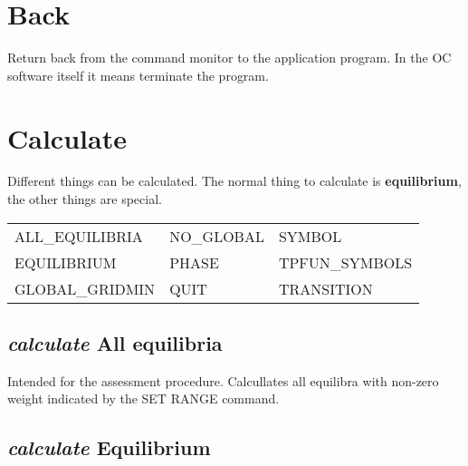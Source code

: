 \documentclass[12pt]{article}
\begin{document}
\section{Back }

Return back from the command monitor to the application program.  In
the OC software itself it means terminate the program.

\section{Calculate }

Different things can be calculated.  The normal thing to calculate is
{\bf equilibrium}, the other things are special.

\begin{tabular}{lll}
 ALL\_EQUILIBRIA &  NO\_GLOBAL  &      SYMBOL\\
 EQUILIBRIUM    &  PHASE     &      TPFUN\_SYMBOLS\\
 GLOBAL\_GRIDMIN & QUIT       &     TRANSITION\\
\end{tabular}
\subsection{{\em calculate} All equilibria}

Intended for the assessment procedure.  Calcullates all equilibra with
non-zero weight indicated by the SET RANGE command.

\subsection{{\em calculate} Equilibrium}
\end{document}
